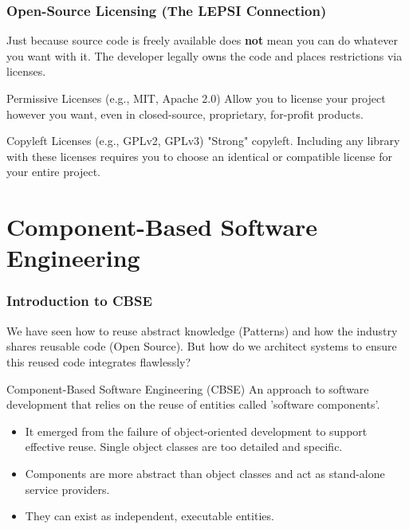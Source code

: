 \documentclass[xcolor=table]{beamer}
\begin{document}
\begin{frame}
    \frametitle{Open-Source Licensing (The LEPSI Connection)}
    
    
    Just because source code is freely available does \textbf{not} mean you can do whatever you want with it. The developer legally owns the code and places restrictions via licenses.
    
    \vspace{0.2cm}
    \begin{block}{Permissive Licenses (e.g., MIT, Apache 2.0)}
        Allow you to license your project however you want, even in closed-source, proprietary, for-profit products.
    \end{block}
    
    \begin{alertblock}{Copyleft Licenses (e.g., GPLv2, GPLv3)}
        "Strong" copyleft. Including any library with these licenses requires you to choose an identical or compatible license for your entire project.
    \end{alertblock}
    
\end{frame}
\section{Component-Based Software Engineering}


\begin{frame}
    \frametitle{Introduction to CBSE}
    We have seen how to reuse abstract knowledge (Patterns) and how the industry shares reusable code (Open Source). But how do we architect systems to ensure this reused code integrates flawlessly?
    
    \vspace{0.2cm}
    \begin{block}{Component-Based Software Engineering (CBSE)}
        An approach to software development that relies on the reuse of entities called 'software components'.
    \end{block}
    \small
    \begin{itemize}
        \item It emerged from the failure of object-oriented development to support effective reuse. Single object classes are too detailed and specific.
        \item Components are more abstract than object classes and act as stand-alone service providers.
        \item They can exist as independent, executable entities.
    \end{itemize}
\end{frame}
\end{document}
